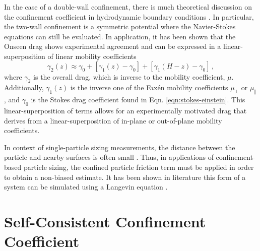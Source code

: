In the case of a double-wall confinement, there is much theoretical discussion on the confinement coefficient in hydrodynamic boundary conditions \cite{lin_diffusion_2000, dufresne_brownian_2001, swan_particle_2010}. In particular, the two-wall confinement is a symmetric potential where the Navier-Stokes equations can still be evaluated. In application, it has been shown that the Onseen drag shows experimental agreement \cite{dufresneBrownianDynamicsSphere2001} and can be expressed in a linear-superposition of linear mobility coefficients
\begin{equation}\label{eqn:LSA}
	\gamma_2(z) \approx \gamma_0 + [\gamma_1(z) - \gamma_0] + [\gamma_1(H-z) - \gamma_0]\,,
\end{equation}
where $\gamma_2$ is the overall drag, which is inverse to the mobility coefficient, $\mu$. Additionally, $\gamma_1(z)$ is the inverse one of the Faxén mobility coefficients $\mu_\perp$ or $\mu_\parallel$, and $\gamma_0$ is the Stokes drag coefficient found in Eqn. \ref{eqn:stokes-einstein}. This linear-superposition of terms allows for an experimentally motivated drag that derives from a linear-superposition of in-plane or out-of-plane mobility coefficients.

In context of single-particle sizing measurements, the distance between the particle and nearby surfaces is often small \cite{kamanzi_simultaneous_2021,graves_direct_2026, kamanzi_single-particle_2026}. Thus, in applications of confinement-based particle sizing, the confined particle friction term must be applied in order to obtain a non-biased estimate. It has been shown in literature this form of a system can be simulated using a Langevin equation \cite{millanNumericalSimulationsConfined2023}.

\clearpage
\section{Self-Consistent Confinement Coefficient}

